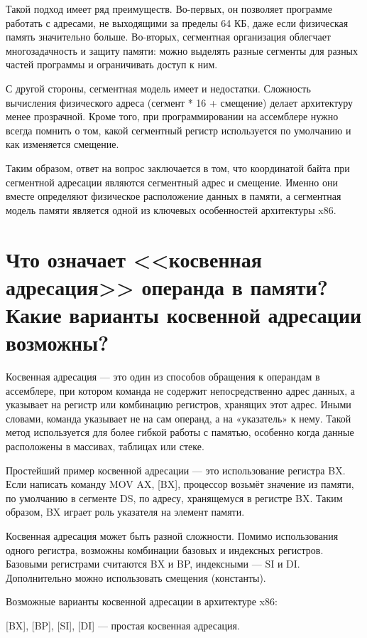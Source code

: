 Такой подход имеет ряд преимуществ. Во-первых, он позволяет программе работать с адресами, не выходящими за пределы 64 КБ, даже если физическая память значительно больше. Во-вторых, сегментная организация облегчает многозадачность и защиту памяти: можно выделять разные сегменты для разных частей программы и ограничивать доступ к ним.

С другой стороны, сегментная модель имеет и недостатки. Сложность вычисления физического адреса (сегмент * 16 + смещение) делает архитектуру менее прозрачной. Кроме того, при программировании на ассемблере нужно всегда помнить о том, какой сегментный регистр используется по умолчанию и как изменяется смещение.

Таким образом, ответ на вопрос заключается в том, что координатой байта при сегментной адресации являются сегментный адрес и смещение. Именно они вместе определяют физическое расположение данных в памяти, а сегментная модель памяти является одной из ключевых особенностей архитектуры x86.

\section{Что означает <<косвенная адресация>> операнда в памяти? Какие варианты косвенной адресации возможны?}

Косвенная адресация — это один из способов обращения к операндам в ассемблере, при котором команда не содержит непосредственно адрес данных, а указывает на регистр или комбинацию регистров, хранящих этот адрес. Иными словами, команда указывает не на сам операнд, а на «указатель» к нему. Такой метод используется для более гибкой работы с памятью, особенно когда данные расположены в массивах, таблицах или стеке.

Простейший пример косвенной адресации — это использование регистра BX. Если написать команду MOV AX, [BX], процессор возьмёт значение из памяти, по умолчанию в сегменте DS, по адресу, хранящемуся в регистре BX. Таким образом, BX играет роль указателя на элемент памяти.

Косвенная адресация может быть разной сложности. Помимо использования одного регистра, возможны комбинации базовых и индексных регистров. Базовыми регистрами считаются BX и BP, индексными — SI и DI. Дополнительно можно использовать смещения (константы).

Возможные варианты косвенной адресации в архитектуре x86:

[BX], [BP], [SI], [DI] — простая косвенная адресация.

